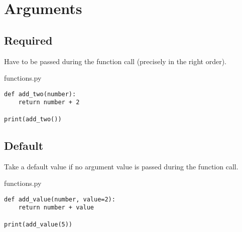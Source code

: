\documentclass[aspectratio=1610,slidestop]{beamer}
\begin{document}
\section{Arguments}

\subsection{Required}
\begin{pframe}
  Have to be passed during the function call (precisely in the right order).
 \begin{pythonfile}{functions.py}
  \begin{verbatim}
def add_two(number):
    return number + 2

print(add_two())
  \end{verbatim}
 \end{pythonfile}
 \pause
 \begin{terminal}
 \end{terminal}
\end{pframe}


\subsection{Default}
\begin{pframe}
 Take a default value if no argument value is passed during the function call.
 \medskip

 \begin{minipage}[t]{0.47\textwidth}
  \begin{pythonfile}{functions.py}
   \begin{verbatim}
def add_value(number, value=2):
    return number + value

print(add_value(5))
   \end{verbatim}
  \end{pythonfile}
 \end{minipage}\qquad
 \begin{minipage}[t]{0.47\textwidth}
  \vspace{-2.6cm}
  \begin{terminal}
  \end{terminal}
 \end{minipage}
\end{pframe}
\end{document}
